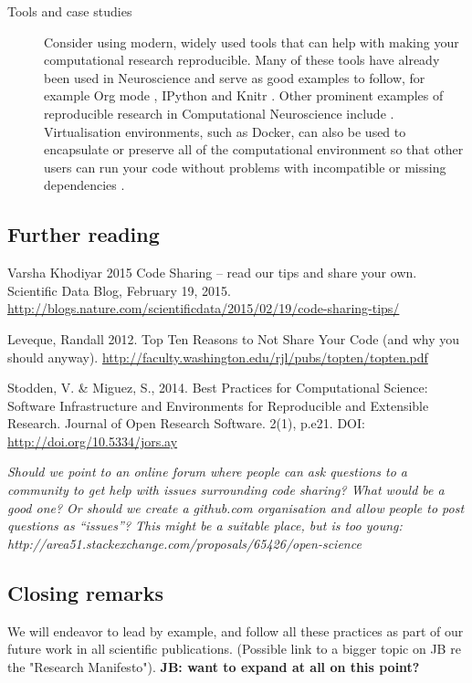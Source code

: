\documentclass[11pt]{article}
\begin{document}
\begin{description}
\item [Tools and case studies] Consider using modern, widely used tools that can help with making your computational research reproducible.  Many of
  these tools have already been used in Neuroscience and serve as good
  examples to follow, for example Org mode \cite{Delescluse2011},
  IPython \cite{Stevens2013} and Knitr \cite{Eglen2014}.  Other
  prominent examples of reproducible research in Computational
  Neuroscience include \cite{Vogels2011-c8c,Waskom2014-gd}.
  Virtualisation environments, such as Docker, can also be used to
  encapsulate or preserve all of the computational environment so that
  other users can run your code without problems with incompatible or missing dependencies \cite{Boettiger2015}.
  

\end{description}

\subsection*{Further reading}

Varsha Khodiyar 2015 Code Sharing – read our tips and share your own. Scientific Data Blog, February 19, 2015. \url{http://blogs.nature.com/scientificdata/2015/02/19/code-sharing-tips/}

Leveque, Randall 2012. Top Ten Reasons to Not Share Your Code (and why
you should anyway). 
\url{http://faculty.washington.edu/rjl/pubs/topten/topten.pdf}

Stodden, V. & Miguez, S., 2014. Best Practices for Computational Science: Software Infrastructure and Environments for Reproducible and Extensible Research. Journal of Open Research Software. 2(1), p.e21. DOI: \url{http://doi.org/10.5334/jors.ay}

\textit{Should we point to an online forum where people can ask
  questions to a community to get help with issues surrounding code
  sharing?  What would be a good one?  Or should we create a
  github.com organisation and allow people to post questions as
  ``issues''? This might be a suitable place, but is too young: http://area51.stackexchange.com/proposals/65426/open-science}


\subsection*{Closing remarks}

We will endeavor to lead by example, and follow all these practices as
part of our future work in all scientific publications.  (Possible
link to a bigger topic on JB re the "Research Manifesto").
\textbf{JB: want to expand at all on this point?}
\end{document}
